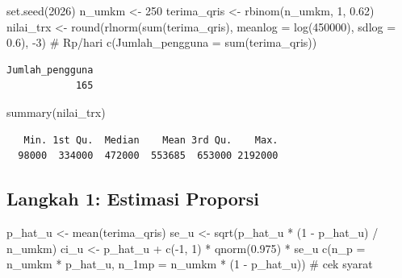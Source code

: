 \documentclass[
  indonesian,
  letterpaper,
]{book}
\newenvironment{Shaded}{\begin{snugshade}}{\end{snugshade}}
\newcommand{\AttributeTok}[1]{\textcolor[rgb]{0.40,0.45,0.13}{#1}}
\newcommand{\CommentTok}[1]{\textcolor[rgb]{0.37,0.37,0.37}{#1}}
\newcommand{\DecValTok}[1]{\textcolor[rgb]{0.68,0.00,0.00}{#1}}
\newcommand{\FloatTok}[1]{\textcolor[rgb]{0.68,0.00,0.00}{#1}}
\newcommand{\FunctionTok}[1]{\textcolor[rgb]{0.28,0.35,0.67}{#1}}
\newcommand{\NormalTok}[1]{\textcolor[rgb]{0.00,0.23,0.31}{#1}}
\newcommand{\OtherTok}[1]{\textcolor[rgb]{0.00,0.23,0.31}{#1}}
\newcommand{\SpecialCharTok}[1]{\textcolor[rgb]{0.37,0.37,0.37}{#1}}
\begin{document}
\begin{Shaded}
\begin{Highlighting}[]
\FunctionTok{set.seed}\NormalTok{(}\DecValTok{2026}\NormalTok{)}
\NormalTok{n\_umkm }\OtherTok{\textless{}{-}} \DecValTok{250}
\NormalTok{terima\_qris }\OtherTok{\textless{}{-}} \FunctionTok{rbinom}\NormalTok{(n\_umkm, }\DecValTok{1}\NormalTok{, }\FloatTok{0.62}\NormalTok{)}
\NormalTok{nilai\_trx }\OtherTok{\textless{}{-}} \FunctionTok{round}\NormalTok{(}\FunctionTok{rlnorm}\NormalTok{(}\FunctionTok{sum}\NormalTok{(terima\_qris), }\AttributeTok{meanlog =} \FunctionTok{log}\NormalTok{(}\DecValTok{450000}\NormalTok{), }\AttributeTok{sdlog =} \FloatTok{0.6}\NormalTok{), }\SpecialCharTok{{-}}\DecValTok{3}\NormalTok{)   }\CommentTok{\# Rp/hari}
\FunctionTok{c}\NormalTok{(}\AttributeTok{Jumlah\_pengguna =} \FunctionTok{sum}\NormalTok{(terima\_qris))}
\end{Highlighting}
\end{Shaded}

\begin{verbatim}
Jumlah_pengguna 
            165 
\end{verbatim}

\begin{Shaded}
\begin{Highlighting}[]
\FunctionTok{summary}\NormalTok{(nilai\_trx)}
\end{Highlighting}
\end{Shaded}

\begin{verbatim}
   Min. 1st Qu.  Median    Mean 3rd Qu.    Max. 
  98000  334000  472000  553685  653000 2192000 
\end{verbatim}

\subsection{Langkah 1: Estimasi
Proporsi}\label{langkah-1-estimasi-proporsi}

\begin{Shaded}
\begin{Highlighting}[]
\NormalTok{p\_hat\_u }\OtherTok{\textless{}{-}} \FunctionTok{mean}\NormalTok{(terima\_qris)}
\NormalTok{se\_u }\OtherTok{\textless{}{-}} \FunctionTok{sqrt}\NormalTok{(p\_hat\_u }\SpecialCharTok{*}\NormalTok{ (}\DecValTok{1} \SpecialCharTok{{-}}\NormalTok{ p\_hat\_u) }\SpecialCharTok{/}\NormalTok{ n\_umkm)}
\NormalTok{ci\_u }\OtherTok{\textless{}{-}}\NormalTok{ p\_hat\_u }\SpecialCharTok{+} \FunctionTok{c}\NormalTok{(}\SpecialCharTok{{-}}\DecValTok{1}\NormalTok{, }\DecValTok{1}\NormalTok{) }\SpecialCharTok{*} \FunctionTok{qnorm}\NormalTok{(}\FloatTok{0.975}\NormalTok{) }\SpecialCharTok{*}\NormalTok{ se\_u}
\FunctionTok{c}\NormalTok{(}\AttributeTok{n\_p =}\NormalTok{ n\_umkm }\SpecialCharTok{*}\NormalTok{ p\_hat\_u, }\AttributeTok{n\_1mp =}\NormalTok{ n\_umkm }\SpecialCharTok{*}\NormalTok{ (}\DecValTok{1} \SpecialCharTok{{-}}\NormalTok{ p\_hat\_u))   }\CommentTok{\# cek syarat}
\end{Highlighting}
\end{Shaded}
\end{document}
